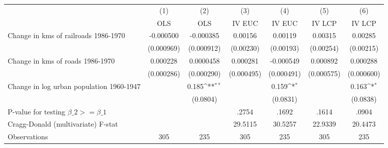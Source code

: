 {
\def\sym#1{\ifmmode^{#1}\else\(^{#1}\)\fi}
\begin{tabular}{l*{6}{c}}
\hline\hline
                &\multicolumn{1}{c}{(1)}&\multicolumn{1}{c}{(2)}&\multicolumn{1}{c}{(3)}&\multicolumn{1}{c}{(4)}&\multicolumn{1}{c}{(5)}&\multicolumn{1}{c}{(6)}\\
                &\multicolumn{1}{c}{OLS}&\multicolumn{1}{c}{OLS}&\multicolumn{1}{c}{IV EUC}&\multicolumn{1}{c}{IV EUC}&\multicolumn{1}{c}{IV LCP}&\multicolumn{1}{c}{IV LCP}\\
\hline
Change in kms of railroads 1986-1970&-0.000500         &-0.000385         &  0.00156         &  0.00119         &  0.00315         &  0.00285         \\
                &(0.000969)         &(0.000912)         &(0.00230)         &(0.00193)         &(0.00254)         &(0.00215)         \\
[1em]
Change in kms of roads 1986-1970& 0.000228         &0.0000458         & 0.000281         &-0.000549         & 0.000892         & 0.000288         \\
                &(0.000286)         &(0.000290)         &(0.000495)         &(0.000491)         &(0.000575)         &(0.000600)         \\
[1em]
Change in log urban population 1960-1947&                  &    0.185\sym{**} &                  &    0.159\sym{*}  &                  &    0.163\sym{*}  \\
                &                  & (0.0804)         &                  & (0.0831)         &                  & (0.0838)         \\
\hline
P-value for testing $\beta\_{2} >= \beta\_{1}$&                  &                  &    .2754         &    .1692         &    .1614         &    .0904         \\
Cragg-Donald (multivariate) F-stat&                  &                  &  29.5115         &  30.5257         &  22.9339         &  20.4473         \\
Observations    &      305         &      235         &      305         &      235         &      305         &      235         \\
\hline\hline
\end{tabular}
}
